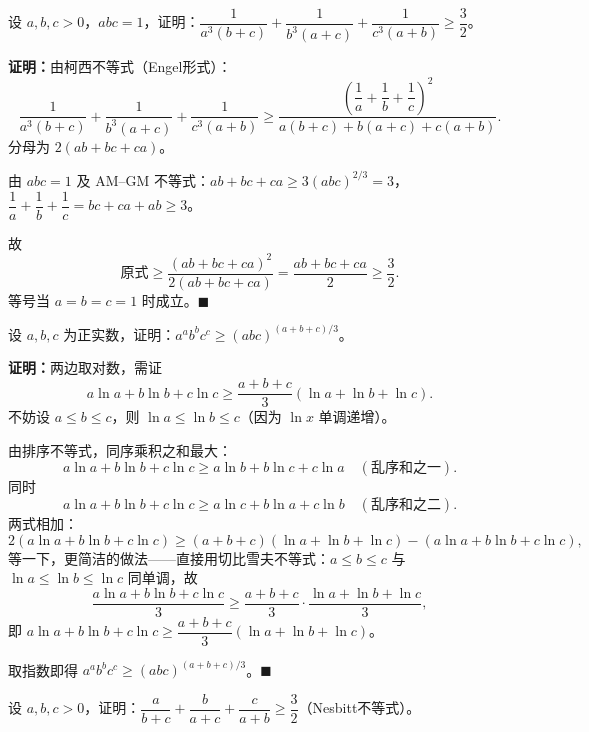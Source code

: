 \documentclass[12pt, a4paper]{ctexart}
\begin{document}
\begin{examplebox}[【例题4】柯西不等式证明不等式]
设 $a, b, c > 0$，$abc = 1$，证明：$\dfrac{1}{a^3(b+c)} + \dfrac{1}{b^3(a+c)} + \dfrac{1}{c^3(a+b)} \geqslant \dfrac{3}{2}$。
\end{examplebox}

\textbf{证明：}由柯西不等式（Engel形式）：
\[
  \frac{1}{a^3(b+c)} + \frac{1}{b^3(a+c)} + \frac{1}{c^3(a+b)} \geqslant \frac{\left(\dfrac{1}{a} + \dfrac{1}{b} + \dfrac{1}{c}\right)^2}{a(b+c) + b(a+c) + c(a+b)}.
\]
分母为 $2(ab + bc + ca)$。

由 $abc = 1$ 及 AM--GM 不等式：$ab + bc + ca \geqslant 3(abc)^{2/3} = 3$，$\dfrac{1}{a} + \dfrac{1}{b} + \dfrac{1}{c} = bc + ca + ab \geqslant 3$。

故
\[
  \text{原式} \geqslant \frac{(ab + bc + ca)^2}{2(ab + bc + ca)} = \frac{ab + bc + ca}{2} \geqslant \frac{3}{2}.
\]
等号当 $a = b = c = 1$ 时成立。\hfill $\blacksquare$

\begin{examplebox}[【例题5】排序不等式基本应用]
设 $a, b, c$ 为正实数，证明：$a^a b^b c^c \geqslant (abc)^{(a+b+c)/3}$。
\end{examplebox}

\textbf{证明：}两边取对数，需证
\[
  a\ln a + b\ln b + c\ln c \geqslant \frac{a+b+c}{3}(\ln a + \ln b + \ln c).
\]
不妨设 $a \leqslant b \leqslant c$，则 $\ln a \leqslant \ln b \leqslant c$（因为 $\ln x$ 单调递增）。

由排序不等式，同序乘积之和最大：
\[
  a\ln a + b\ln b + c\ln c \geqslant a\ln b + b\ln c + c\ln a \quad (\text{乱序和之一}).
\]
同时
\[
  a\ln a + b\ln b + c\ln c \geqslant a\ln c + b\ln a + c\ln b \quad (\text{乱序和之二}).
\]
两式相加：
\[
  2(a\ln a + b\ln b + c\ln c) \geqslant (a+b+c)(\ln a + \ln b + \ln c) - (a\ln a + b\ln b + c\ln c),
\]
等一下，更简洁的做法——直接用切比雪夫不等式：$a \leqslant b \leqslant c$ 与 $\ln a \leqslant \ln b \leqslant \ln c$ 同单调，故
\[
  \frac{a\ln a + b\ln b + c\ln c}{3} \geqslant \frac{a+b+c}{3} \cdot \frac{\ln a + \ln b + \ln c}{3},
\]
即 $a\ln a + b\ln b + c\ln c \geqslant \dfrac{a+b+c}{3}(\ln a + \ln b + \ln c)$。

取指数即得 $a^a b^b c^c \geqslant (abc)^{(a+b+c)/3}$。\hfill $\blacksquare$

\begin{examplebox}[【例题6】排序不等式证明经典不等式]
设 $a, b, c > 0$，证明：$\dfrac{a}{b+c} + \dfrac{b}{a+c} + \dfrac{c}{a+b} \geqslant \dfrac{3}{2}$（Nesbitt不等式）。
\end{examplebox}
\end{document}
